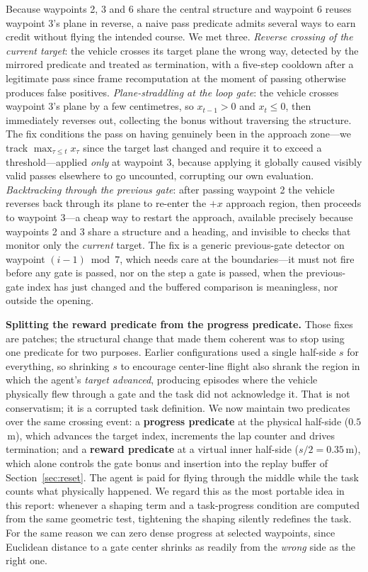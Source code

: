 \documentclass[10pt, twocolumn]{article}
\begin{document}
Because waypoints 2, 3 and 6 share the central structure and waypoint 6 reuses
waypoint 3's plane in reverse, a naive pass predicate admits several ways to
earn credit without flying the intended course. We met three.
\emph{Reverse crossing of the current target}: the vehicle crosses its target
plane the wrong way, detected by the mirrored predicate and treated as
termination, with a five-step cooldown after a legitimate pass since frame
recomputation at the moment of passing otherwise produces false positives.
\emph{Plane-straddling at the loop gate}: the vehicle crosses waypoint 3's
plane by a few centimetres, so $x_{t-1} > 0$ and $x_t \leq 0$, then immediately
reverses out, collecting the bonus without traversing the structure. The fix
conditions the pass on having genuinely been in the approach zone---we track
$\max_{\tau \leq t} x_\tau$ since the target last changed and require it to
exceed a threshold---applied \emph{only} at waypoint 3, because applying it
globally caused visibly valid passes elsewhere to go uncounted, corrupting our
own evaluation. \emph{Backtracking through the previous gate}: after passing
waypoint 2 the vehicle reverses back through its plane to re-enter the $+x$
approach region, then proceeds to waypoint 3---a cheap way to restart the
approach, available precisely because waypoints 2 and 3 share a structure and a
heading, and invisible to checks that monitor only the \emph{current} target.
The fix is a generic previous-gate detector on waypoint $(i-1) \bmod 7$, which
needs care at the boundaries---it must not fire before any gate is passed, nor
on the step a gate is passed, when the previous-gate index has just changed and
the buffered comparison is meaningless, nor outside the opening.

\textbf{Splitting the reward predicate from the progress predicate.} Those
fixes are patches; the structural change that made them coherent was to stop
using one predicate for two purposes. Earlier configurations used a single
half-side $s$ for everything, so shrinking $s$ to encourage center-line flight
also shrank the region in which the agent's \emph{target advanced}, producing
episodes where the vehicle physically flew through a gate and the task did not
acknowledge it. That is not conservatism; it is a corrupted task definition. We
now maintain two predicates over the same crossing event: a \textbf{progress
predicate} at the physical half-side ($0.5$\,m), which advances the target
index, increments the lap counter and drives termination; and a \textbf{reward
predicate} at a virtual inner half-side ($s/2 = 0.35$\,m), which alone controls
the gate bonus and insertion into the replay buffer of
Section~\ref{sec:reset}. The agent is paid for flying through the middle while
the task counts what physically happened. We regard this as the most portable
idea in this report: whenever a shaping term and a task-progress condition are
computed from the same geometric test, tightening the shaping silently
redefines the task. For the same reason we can zero dense progress at selected
waypoints, since Euclidean distance to a gate center shrinks as readily from
the \emph{wrong} side as the right one.
\end{document}
